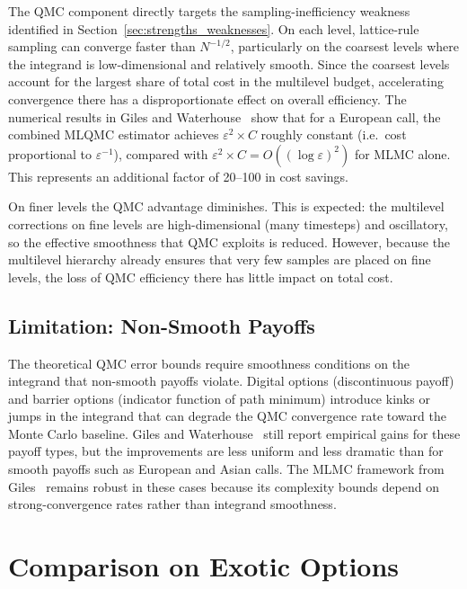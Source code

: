 \documentclass[11pt]{article}
\begin{document}
The QMC component directly targets the sampling-inefficiency weakness identified in Section~\ref{sec:strengths_weaknesses}. On each level, lattice-rule sampling can converge faster than $N^{-1/2}$, particularly on the coarsest levels where the integrand is low-dimensional and relatively smooth. Since the coarsest levels account for the largest share of total cost in the multilevel budget, accelerating convergence there has a disproportionate effect on overall efficiency. The numerical results in Giles and Waterhouse~\cite{giles2009} show that for a European call, the combined MLQMC estimator achieves $\varepsilon^{2} \times C$ roughly constant (i.e.\ cost proportional to $\varepsilon^{-1}$), compared with $\varepsilon^{2} \times C = O((\log\varepsilon)^{2})$ for MLMC alone. This represents an additional factor of 20--100 in cost savings.

On finer levels the QMC advantage diminishes. This is expected: the multilevel corrections on fine levels are high-dimensional (many timesteps) and oscillatory, so the effective smoothness that QMC exploits is reduced. However, because the multilevel hierarchy already ensures that very few samples are placed on fine levels, the loss of QMC efficiency there has little impact on total cost.

\subsection{Limitation: Non-Smooth Payoffs}\label{subsec:nonsmooth}

The theoretical QMC error bounds require smoothness conditions on the integrand that non-smooth payoffs violate. Digital options (discontinuous payoff) and barrier options (indicator function of path minimum) introduce kinks or jumps in the integrand that can degrade the QMC convergence rate toward the Monte Carlo baseline. Giles and Waterhouse~\cite{giles2009} still report empirical gains for these payoff types, but the improvements are less uniform and less dramatic than for smooth payoffs such as European and Asian calls. The MLMC framework from Giles~\cite{giles2008} remains robust in these cases because its complexity bounds depend on strong-convergence rates rather than integrand smoothness.

\section{Comparison on Exotic Options}\label{sec:exotic}
\end{document}
